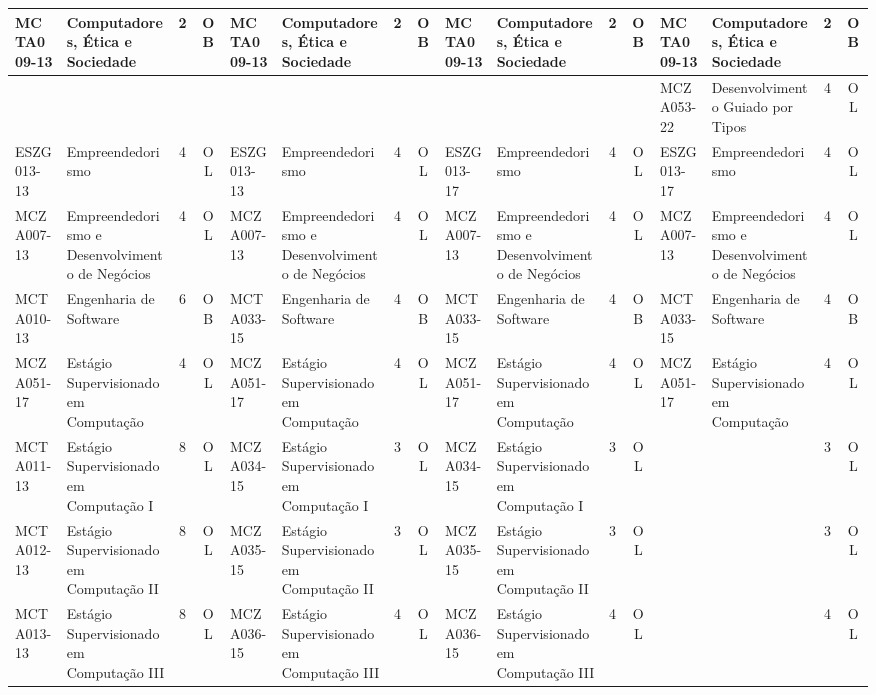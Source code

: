 \documentclass[a4paper]{article}
\begin{document}
\begin{landscape}
{\begin{longtable}{|l|p{.15\textheight}|c|c||l|p{.15\textheight}|c|c||l|p{.15\textheight}|c|c||l|p{.15\textheight}|c|c|}
    MCTA009-13 & Computadores, Ética e Sociedade & 2 & OB &
    MCTA009-13 & Computadores, Ética e Sociedade & 2 & OB &
    MCTA009-13 & Computadores, Ética e Sociedade & 2 & OB &
    MCTA009-13 & Computadores, Ética e Sociedade & 2 & OB \\ \hline

    & & & &
    & & & &
    & & & &
    MCZA053-22 & Desenvolvimento Guiado por Tipos & 4 & OL\\ \hline

    ESZG013-13 & Empreendedorismo & 4 & OL &
    ESZG013-13 & Empreendedorismo & 4 & OL &
    ESZG013-17 & Empreendedorismo & 4 & OL &
    ESZG013-17 & Empreendedorismo & 4 & OL \\ \hline
    
    MCZA007-13 & Empreendedorismo e Desenvolvimento de Negócios & 4 & OL &
    MCZA007-13 & Empreendedorismo e Desenvolvimento de Negócios & 4 & OL &
    MCZA007-13 & Empreendedorismo e Desenvolvimento de Negócios & 4 & OL &
    MCZA007-13 & Empreendedorismo e Desenvolvimento de Negócios & 4 & OL \\ \hline

    MCTA010-13 & Engenharia de Software & 6 &  OB &
    MCTA033-15 & Engenharia de Software & 4 &  OB &
    MCTA033-15 & Engenharia de Software & 4 &  OB &
    MCTA033-15 & Engenharia de Software & 4 &  OB \\ \hline

    MCZA051-17 & Estágio Supervisionado em Computação & 4 & OL &
    MCZA051-17 & Estágio Supervisionado em Computação & 4 & OL &
    MCZA051-17 & Estágio Supervisionado em Computação & 4 & OL &
    MCZA051-17 & Estágio Supervisionado em Computação & 4 & OL \\ \hline

    MCTA011-13 & Estágio Supervisionado em Computação I & 8 & OL &
    MCZA034-15 & Estágio Supervisionado em Computação I & 3 & OL &
    MCZA034-15 & Estágio Supervisionado em Computação I & 3 & OL &
               &                                        & 3 & OL \\ \hline

    MCTA012-13 & Estágio Supervisionado em Computação II & 8 & OL &
    MCZA035-15 & Estágio Supervisionado em Computação II & 3 & OL &
    MCZA035-15 & Estágio Supervisionado em Computação II & 3 & OL &
    &  & 3 & OL \\ \hline

    MCTA013-13 & Estágio Supervisionado em Computação III & 8 & OL &
    MCZA036-15 & Estágio Supervisionado em Computação III & 4 & OL &
    MCZA036-15 & Estágio Supervisionado em Computação III & 4 & OL &
    &  & 4 & OL \\ \hline


\end{longtable}}
\end{landscape}
\end{document}
